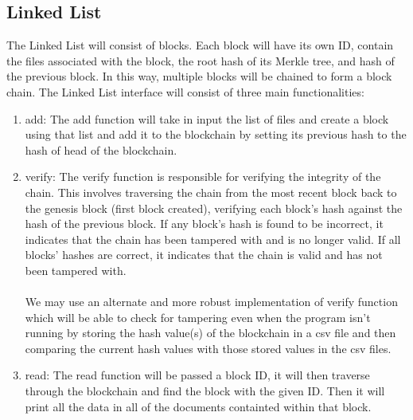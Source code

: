 \documentclass{article}
\begin{document}
\subsection{Linked List}
The Linked List will consist of blocks. Each block will have its own ID, contain the files associated with the block, the root hash of its Merkle 
tree, and hash of the previous block. In this way, multiple blocks 
will be chained to form a block chain. The Linked List interface will consist of three main functionalities:
\begin{enumerate}
\item add: The add function will take in input the list of files and create a block using that list and add it to the blockchain by setting its previous hash to the hash of head of the blockchain. 
\item verify: The verify function is responsible for verifying the integrity of the chain. This involves traversing the chain from the most recent block back to the genesis block (first block created), verifying each block's hash against the hash of the previous block. If any block's hash is found to be incorrect, it indicates that the chain has been tampered with and is no longer valid. If all blocks' hashes are correct, it indicates that the chain is valid and has not been tampered with. 
\\\\ We may use an alternate and more robust implementation of verify function which will 
be able to check for tampering even when the program isn't running by storing the hash value(s) of the blockchain
in a csv file and then comparing the current hash values with those stored values in the csv files. 
\item read: The read function will be passed a block ID, it will then traverse through the blockchain and find the block with the given ID. Then it will print all the data in all of the documents containted within that block. 
\end{enumerate}
\end{document}
